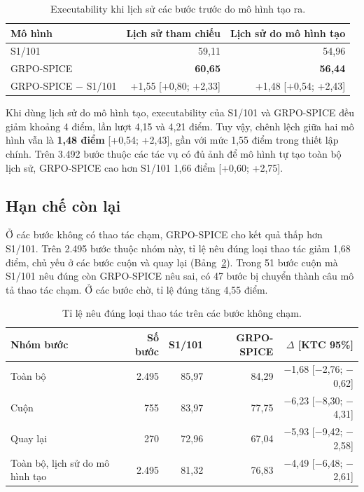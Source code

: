 \begin{table}[htbp]
\centering\small
\caption{Executability khi lịch sử các bước trước do mô hình tạo ra.}\label{tab:6.tusinh}
\begin{tabular}{@{}lrr@{}}
\toprule
\textbf{Mô hình} & \textbf{Lịch sử tham chiếu} & \textbf{Lịch sử do mô hình tạo} \\
\midrule
S1/101 & 59,11 & 54,96 \\
GRPO-SPICE & \textbf{60,65} & \textbf{56,44} \\
\midrule
GRPO-SPICE $-$ S1/101 & +1,55 [+0,80; +2,33] & +1,48 [+0,54; +2,43] \\
\bottomrule
\end{tabular}
\end{table}

Khi dùng lịch sử do mô hình tạo, executability của S1/101 và GRPO-SPICE đều giảm khoảng 4 điểm, lần lượt 4,15 và 4,21 điểm. Tuy vậy, chênh lệch giữa hai mô hình vẫn là \textbf{1,48 điểm} [+0,54; +2,43], gần với mức 1,55 điểm trong thiết lập chính. Trên 3.492 bước thuộc các tác vụ có đủ ảnh để mô hình tự tạo toàn bộ lịch sử, GRPO-SPICE cao hơn S1/101 1,66 điểm [+0,60; +2,75].

\subsection{Hạn chế còn lại}\label{sec:6.3.1}

Ở các bước không có thao tác chạm, GRPO-SPICE cho kết quả thấp hơn S1/101. Trên 2.495 bước thuộc nhóm này, tỉ lệ nêu đúng loại thao tác giảm 1,68 điểm, chủ yếu ở các bước cuộn và quay lại (Bảng~\ref{tab:6.khongcham}). Trong 51 bước cuộn mà S1/101 nêu đúng còn GRPO-SPICE nêu sai, có 47 bước bị chuyển thành câu mô tả thao tác chạm. Ở các bước chờ, tỉ lệ đúng tăng 4,55 điểm.

\begin{table}[htbp]
\centering\small
\caption{Tỉ lệ nêu đúng loại thao tác trên các bước không chạm.}\label{tab:6.khongcham}
\setlength{\tabcolsep}{4pt}
\begin{tabular}{@{}lrrrr@{}}
\toprule
\textbf{Nhóm bước} & \textbf{Số bước} & \textbf{S1/101} & \textbf{GRPO-SPICE} & \textbf{$\Delta$ [KTC 95\%]} \\
\midrule
Toàn bộ & 2.495 & 85,97 & 84,29 & $-$1,68 [$-$2,76; $-$0,62] \\
Cuộn & 755 & 83,97 & 77,75 & $-$6,23 [$-$8,30; $-$4,31] \\
Quay lại & 270 & 72,96 & 67,04 & $-$5,93 [$-$9,42; $-$2,58] \\
Toàn bộ, lịch sử do mô hình tạo & 2.495 & 81,32 & 76,83 & $-$4,49 [$-$6,48; $-$2,61] \\
\bottomrule
\end{tabular}
\end{table}

